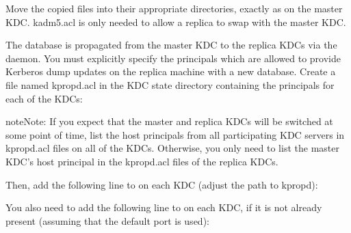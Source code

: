 \documentclass[letterpaper,10pt,english]{sphinxmanual}
\begin{document}
Move the copied files into their appropriate directories, exactly as
on the master KDC.  kadm5.acl is only needed to allow a replica to
swap with the master KDC.

The database is propagated from the master KDC to the replica KDCs via
the {\hyperref[\detokenize{admin/admin_commands/kpropd:kpropd-8}]{}} daemon.  You must explicitly specify the
principals which are allowed to provide Kerberos dump updates on the
replica machine with a new database.  Create a file named kpropd.acl
in the KDC state directory containing the  principals for each
of the KDCs:

%
\begin{sphinxVerbatim}[commandchars=\\\{\}]
\end{sphinxVerbatim}

\begin{sphinxadmonition}{note}{Note:}
If you expect that the master and replica KDCs will be
switched at some point of time, list the host principals
from all participating KDC servers in kpropd.acl files on
all of the KDCs.  Otherwise, you only need to list the
master KDC’s host principal in the kpropd.acl files of the
replica KDCs.
\end{sphinxadmonition}

Then, add the following line to  on each KDC
(adjust the path to kpropd):

%
\begin{sphinxVerbatim}[commandchars=\\\{\}]
      
\end{sphinxVerbatim}

You also need to add the following line to  on each
KDC, if it is not already present (assuming that the default port is
used):

%
\begin{sphinxVerbatim}[commandchars=\\\{\}]
                      
\end{sphinxVerbatim}
\end{document}
